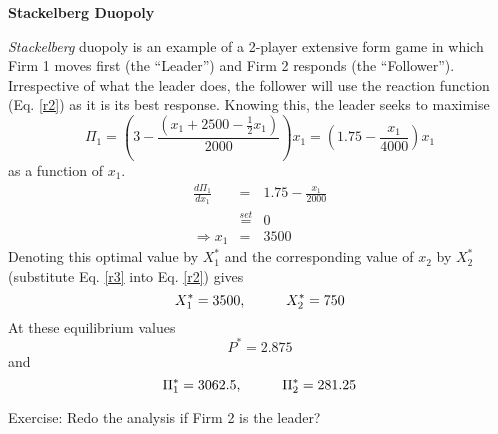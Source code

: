 \documentclass[12pt]{article}
\begin{document}
 \begin{center}
\textbf{Stackelberg Duopoly %
}
\end{center}
\textit{Stackelberg} duopoly is an example of a 2-player extensive form game in which Firm 1 moves first (the ``Leader'') and Firm 2 responds (the ``Follower''). Irrespective of what the leader does, the follower will use the reaction function (Eq. \ref{r2}) as it is its best response.
\newpage
Knowing this, the leader seeks to maximise $$ \Pi_1 = \left(3 - \frac{\left(x_1 + 2500 - \frac{1}{2} x_1\right)}{2000}\right) x_1 = \left(1.75 - \frac{x_1}{4000}\right) x_1$$
as a function of $x_1$.
\begin{eqnarray}
 \frac{d \Pi_1} {d x_1} &=& 1.75 - \frac{x_1}{2000} \nonumber \\
 & \stackrel{set}{=} & 0 \nonumber \\
 \Rightarrow x_1 &=& 3500 \label{r3}
 \end{eqnarray}
 Denoting this optimal value by $X_1^*$ and the corresponding value of $x_2$ by $X_2^*$ (substitute Eq. \ref{r3} into Eq. \ref{r2}) gives
$$ X_1^* = 3500, \hspace{10mm} X_2^* = 750 $$
At these equilibrium values
$$ P^* = 2.875 $$
 and
 \begin{equation} \Pi_1^* = 3062.5, \hspace{10mm} \Pi_2^* = 281.25 \label{sp} \end{equation}

Exercise: Redo the analysis if Firm 2 is the leader?
\end{document}
